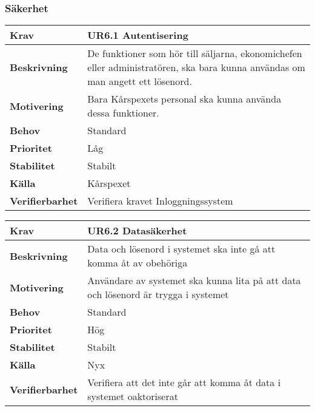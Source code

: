 \documentclass[a4paper, twoside, 11pt, titlepage]{article}
\begin{document}
		\subsubsection{Säkerhet}


		\begin {table} [ht] \begin{tabular} { p{2.6cm} p{12.5cm} }
			\hline
			{\sffamily\textbf{Krav}} & {\sffamily\textbf{UR6.1 Autentisering}} \\
			\hline
			{\sffamily\textbf{Beskrivning}} & {De funktioner som hör till säljarna, ekonomichefen eller administratören, ska bara kunna användas om man angett ett lösenord.} \\
			\hline
			{\sffamily\textbf{Motivering}} & {Bara Kårspexets personal ska kunna använda dessa funktioner.} \\
			\hline
			{\sffamily\textbf{Behov}} & {Standard} \\
			\hline
			{\sffamily\textbf{Prioritet}} & {Låg} \\
			\hline
			{\sffamily\textbf{Stabilitet}} & {Stabilt} \\
			\hline
			{\sffamily\textbf{Källa}} & {Kårspexet} \\
			\hline
			{\sffamily\textbf{Verifierbarhet}} & {Verifiera kravet Inloggningssystem} \\
			\hline
		\end{tabular} \end{table} \FloatBarrier
		\vspace{6mm}

		\begin {table} [ht] \begin{tabular} { p{2.6cm} p{12.5cm} }
			\hline
			{\sffamily\textbf{Krav}} & {\sffamily\textbf{UR6.2 Datasäkerhet}} \\
			\hline
			{\sffamily\textbf{Beskrivning}} & {Data och lösenord i systemet ska inte gå att komma åt av obehöriga} \\
			\hline
			{\sffamily\textbf{Motivering}} & {Användare av systemet ska kunna lita på att data och lösenord är trygga i systemet} \\
			\hline
			{\sffamily\textbf{Behov}} & {Standard} \\
			\hline
			{\sffamily\textbf{Prioritet}} & {Hög} \\
			\hline
			{\sffamily\textbf{Stabilitet}} & {Stabilt} \\
			\hline
			{\sffamily\textbf{Källa}} & {Nyx} \\
			\hline
			{\sffamily\textbf{Verifierbarhet}} & {Verifiera att det inte går att komma åt data i systemet oaktoriserat} \\
			\hline
		\end{tabular} \end{table} \FloatBarrier
		\vspace{6mm}
\end{document}
